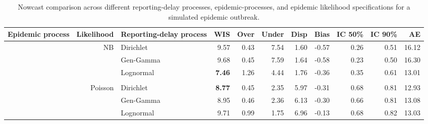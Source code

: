 \documentclass[12pt]{article}
\begin{document}
\begin{table}[!htb]
\centering
\caption{Nowcast comparison across different reporting-delay processes, epidemic-processes, and epidemic likelihood specifications for a simulated epidemic outbreak.}
\tiny
\setlength{\tabcolsep}{3pt}
\begin{tabular}{>{\raggedleft\arraybackslash}p{0.45in}|r | >{\raggedleft\arraybackslash}p{0.85in} | r r r r r r r r}
\toprule
\bf Epidemic process & \bf Likelihood & \bf Reporting-delay process  & \bf WIS & \bf Over & \bf Under & \bf Disp & \bf Bias & \bf IC 50\% & \bf IC 90\% & \bf AE \\
\midrule

\multirow{7}{*}{AR(1)}
& \multirow{3}{*}{NB}
& \cellcolor{delayC!25}Dirichlet & \cellcolor{delayC!25}9.57 & \cellcolor{delayC!25}0.43 & \cellcolor{delayC!25}7.54 & \cellcolor{delayC!25}1.60 & \cellcolor{delayC!25}-0.57 & \cellcolor{delayC!25}0.26 & \cellcolor{delayC!25}0.51 & \cellcolor{delayC!25}16.12 \\
& & \cellcolor{delayB!25}Gen-Gamma & \cellcolor{delayB!25}9.68 & \cellcolor{delayB!25}0.45 & \cellcolor{delayB!25}7.59 & \cellcolor{delayB!25}1.64 & \cellcolor{delayB!25}-0.58 & \cellcolor{delayB!25}0.23 & \cellcolor{delayB!25}0.50 & \cellcolor{delayB!25}16.30 \\
& & \cellcolor{delayA!25}Lognormal & \cellcolor{delayA!25}\bf  7.46 & \cellcolor{delayA!25}1.26 & \cellcolor{delayA!25}4.44 & \cellcolor{delayA!25}1.76 & \cellcolor{delayA!25}-0.36 & \cellcolor{delayA!25}0.35 & \cellcolor{delayA!25}0.61 & \cellcolor{delayA!25}13.01 \\

\\

& \multirow{3}{*}{Poisson}
& \cellcolor{delayC!25}Dirichlet & \cellcolor{delayC!25}\bf  8.77 & \cellcolor{delayC!25}0.45 & \cellcolor{delayC!25}2.35 & \cellcolor{delayC!25}5.97 & \cellcolor{delayC!25}-0.31 & \cellcolor{delayC!25}0.68 & \cellcolor{delayC!25}0.81 & \cellcolor{delayC!25}12.93 \\
& & \cellcolor{delayB!25}Gen-Gamma & \cellcolor{delayB!25}8.95 & \cellcolor{delayB!25}0.46 & \cellcolor{delayB!25}2.36 & \cellcolor{delayB!25}6.13 & \cellcolor{delayB!25}-0.30 & \cellcolor{delayB!25}0.66 & \cellcolor{delayB!25}0.81 & \cellcolor{delayB!25}13.08 \\
& & \cellcolor{delayA!25}Lognormal & \cellcolor{delayA!25}9.71 & \cellcolor{delayA!25}0.99 & \cellcolor{delayA!25}1.75 & \cellcolor{delayA!25}6.96 & \cellcolor{delayA!25}-0.13 & \cellcolor{delayA!25}0.68 & \cellcolor{delayA!25}0.82 & \cellcolor{delayA!25}13.03 \\


\end{tabular}
\end{table}
\end{document}
